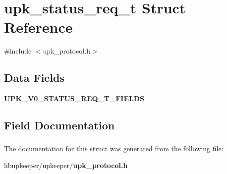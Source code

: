 \section{upk\_\-status\_\-req\_\-t Struct Reference}
\label{structupk__status__req__t}


{\ttfamily \#include $<$upk\_\-protocol.h$>$}

\subsection*{Data Fields}
\begin{DoxyCompactItemize}
\item 
{\bf UPK\_\-V0\_\-STATUS\_\-REQ\_\-T\_\-FIELDS}
\end{DoxyCompactItemize}


\subsection{Field Documentation}
\subsubsection[{UPK\_\-V0\_\-STATUS\_\-REQ\_\-T\_\-FIELDS}]{}\label{structupk__status__req__t_aeb4d1536ddd74065120f113074313350}


The documentation for this struct was generated from the following file:\begin{DoxyCompactItemize}
\item 
libupkeeper/upkeeper/{\bf upk\_\-protocol.h}\end{DoxyCompactItemize}
